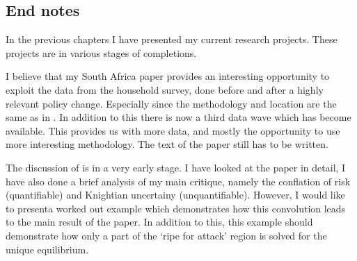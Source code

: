 \begin{refsection}
\chapter{End notes}
\label{end-notes}
In the previous chapters I have presented my current research projects.
These projects are in various stages of completions.

I believe that my South Africa paper provides an interesting opportunity to exploit the data from the household survey,
done before and after a highly relevant policy change.
Especially since the methodology and location are the same as in \textcite{duflo2000child, duflo2003grandmothers}.
In addition to this there is now a third data wave which has become available.
This provides us with more data, and mostly the opportunity to use more interesting methodology.
The text of the paper still has to be written. 




The discussion of \textcite{morris1998unique} is in a very early stage.
I have looked at the paper in detail, I have also done a brief analysis of my main critique,
namely the conflation of risk (quantifiable) and Knightian uncertainy (unquantifiable).
However, I would like to presenta worked out example which demonstrates how this convolution leads to the main result of the paper.
In addition to this, this example should demonstrate how only a part of the `ripe for attack' region is solved for the unique equilibrium.


\end{refsection}
